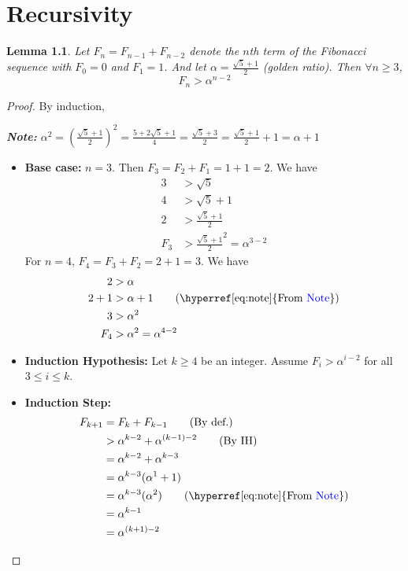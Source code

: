 \documentclass[openany]{report}
\newtheorem{lemma}{Lemma}[section]
\begin{document}
\chapter{Recursivity}
\begin{lemma}
    Let $F_n = F_{n-1} + F_{n-2}$ denote the $n$th term of the Fibonacci sequence with $F_0 = 0$ and $F_1 = 1$. And let $\alpha = \frac{\sqrt{5}+1}{2}$ (golden ratio). Then $\forall n \geq 3$, 
    \[F_n > \alpha^{n-2}\]
\end{lemma}
\begin{proof}
    By induction, 
    \begin{center}
        \textit{\textbf{Note:} $\alpha^2 = \left(\frac{\sqrt{5}+1}{2}\right)^2 = \frac{5 +2\sqrt{5} + 1}{4} = \frac{\sqrt{5} + 3}{2} = \frac{\sqrt{5}+1}{2} + 1 = \alpha + 1$}
    \end{center}\label{eq:note}
    \begin{itemize}
        \item \textbf{Base case:} $n = 3$. Then $F_3 = F_2 + F_1 = 1 + 1 = 2$. We have 
        \begin{align*}
            3 &> \sqrt{5}\\
            4 &> \sqrt{5} + 1\\
            2 &> \frac{\sqrt{5} + 1}{2}\\
            F_3 &> \frac{\sqrt{5} + 1}{2}^2 = \alpha^{3-2}
        \end{align*}
        For $n = 4$, $F_4 = F_3 + F_2 = 2 + 1 = 3$. We have
        \begin{align*}
            2 &> \alpha\\
            2 + 1 &> \alpha + 1\tag{\hyperref[eq:note]{From \blue{Note}}}\\
            3 &> \alpha^2\\
            F_4 &> \alpha^2 = \alpha^{4-2}
        \end{align*}
        \item \textbf{Induction Hypothesis:} Let $k \geq 4$ be an integer. Assume $F_i > \alpha^{i-2}$ for all $3 \leq i \leq k$.
        \item \textbf{Induction Step:}
        \begin{align*}
            F_{k+1} &= F_k + F_{k-1}\tag{By def.}\\
            &> \alpha^{k-2} + \alpha^{(k-1)-2}\tag{By IH}\\
            &= \alpha^{k-2} + \alpha^{k-3}\\
            &= \alpha^{k-3}(\alpha^1 + 1)\\
            &= \alpha^{k-3}(\alpha^2)\tag{\hyperref[eq:note]{From \blue{Note}}}\\
            &= \alpha^{k-1}\\
            &= \alpha^{(k+1)-2} 
        \end{align*}
    \end{itemize}
\end{proof}
\end{document}
